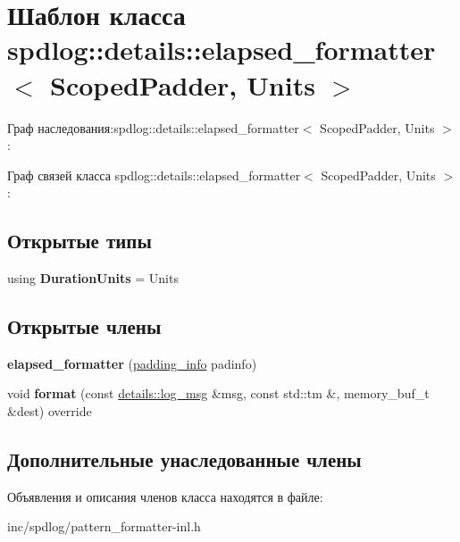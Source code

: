 \hypertarget{classspdlog_1_1details_1_1elapsed__formatter}{}\section{Шаблон класса spdlog\+:\+:details\+:\+:elapsed\+\_\+formatter$<$ Scoped\+Padder, Units $>$}
\label{classspdlog_1_1details_1_1elapsed__formatter}


Граф наследования\+:spdlog\+:\+:details\+:\+:elapsed\+\_\+formatter$<$ Scoped\+Padder, Units $>$\+:


Граф связей класса spdlog\+:\+:details\+:\+:elapsed\+\_\+formatter$<$ Scoped\+Padder, Units $>$\+:
\subsection*{Открытые типы}
\begin{DoxyCompactItemize}
\item 
\mbox{\label{classspdlog_1_1details_1_1elapsed__formatter_a506373833c7ef5b6055b9a0946cb5730}} 
using {\bfseries Duration\+Units} = Units
\end{DoxyCompactItemize}
\subsection*{Открытые члены}
\begin{DoxyCompactItemize}
\item 
\mbox{\label{classspdlog_1_1details_1_1elapsed__formatter_af69fcc31745c91aa750ad2a13f2cc4e1}} 
{\bfseries elapsed\+\_\+formatter} (\hyperlink{structspdlog_1_1details_1_1padding__info}{padding\+\_\+info} padinfo)
\item 
\mbox{\label{classspdlog_1_1details_1_1elapsed__formatter_a18925fb4f611dff65ebe7cd2437c24a8}} 
void {\bfseries format} (const \hyperlink{structspdlog_1_1details_1_1log__msg}{details\+::log\+\_\+msg} \&msg, const std\+::tm \&, memory\+\_\+buf\+\_\+t \&dest) override
\end{DoxyCompactItemize}
\subsection*{Дополнительные унаследованные члены}


Объявления и описания членов класса находятся в файле\+:\begin{DoxyCompactItemize}
\item 
inc/spdlog/pattern\+\_\+formatter-\/inl.\+h\end{DoxyCompactItemize}
